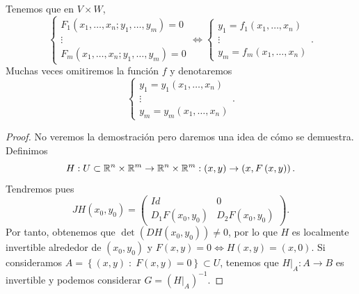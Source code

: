 \begin{notation}
Tenemos que en $\displaystyle V \times W $,
\[
\begin{cases}
F_{1}\left(x_{1}, \ldots, x_{n}; y_{1}, \ldots, y_{m}\right) = 0 \\
\vdots \\
F_{m}\left(x_{1}, \ldots, x_{n}; y_{1}, \ldots, y_{m}\right) = 0
\end{cases} 
\iff 
\begin{cases}
y_{1} = f_{1}\left(x_{1}, \ldots, x_{n}\right) \\
\vdots \\
y_{m} = f_{m}\left(x_{1}, \ldots, x_{n}\right)
\end{cases}
.\]
Muchas veces omitiremos la función $\displaystyle f $ y denotaremos 
\[
\begin{cases}
y_{1} = y_{1}\left(x_{1}, \ldots, x_{n}\right) \\
\vdots \\ 
y_{m} = y_{m}\left(x_{1}, \ldots, x_{n}\right)
\end{cases}
.\]
\end{notation}
\begin{proof}
No veremos la demostración pero daremos una idea de cómo se demuestra. Definimos 
\[H:U \subset \mathbb{R}^{n} \times \mathbb{R}^{m} \to \mathbb{R}^{n} \times \mathbb{R}^{m} : \left(x,y\right) \to \left(x, F\left(x,y\right)\right) .\]
Tendremos pues
\[JH\left(x_{0},y_{0}\right) = \begin{pmatrix} Id & 0 \\ D_{1}F\left(x_{0}, y_{0}\right) & D_{2}F\left(x_{0}, y_{0}\right) \end{pmatrix} .\]
Por tanto, obtenemos que $\displaystyle \det\left(DH\left(x_{0}, y_{0}\right)\right) \neq 0 $, por lo que $\displaystyle H $ es localmente invertible alrededor de $\displaystyle \left(x_{0}, y_{0}\right) $ y $\displaystyle F\left(x,y\right) = 0 \iff H\left(x,y\right) = \left(x,0\right) $. Si consideramos $\displaystyle A = \left\{ \left(x,y\right) \; : \; F\left(x,y\right) = 0\right\}  \subset U$, tenemos que $\displaystyle H|_{A} : A \to B $ es invertible y podemos considerar $\displaystyle G = \left(H|_{A}\right)^{-1} $.
\end{proof}
